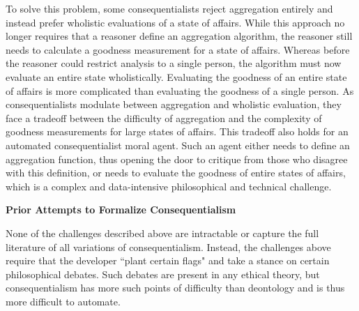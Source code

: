 \begin{isabellebody}
\begin{isamarkuptext}
To solve this problem, some consequentialists reject aggregation entirely and instead prefer wholistic
evaluations of a state of affairs. While this approach no longer requires that a reasoner define an 
aggregation algorithm, the reasoner still needs to calculate a goodness measurement for a state of 
affairs. Whereas before the reasoner could restrict analysis to a single person, the algorithm must now 
evaluate an entire state wholistically. Evaluating the goodness of an entire state of affairs is more complicated
than evaluating the goodness of a single person. As consequentialists modulate between aggregation 
and wholistic evaluation, they face a tradeoff between the difficulty of aggregation and the complexity 
of goodness measurements for large states of affairs. This tradeoff also holds for an automated
consequentialist moral agent. Such an agent either needs to define an aggregation function, thus opening 
the door to critique from those who disagree with this definition, or needs to evaluate the goodness of entire states
of affairs, which is a complex and data-intensive philosophical and technical challenge.%
\end{isamarkuptext}\isamarkuptrue%
%
\begin{isamarkuptext}%
\textbf{Prior Attempts to Formalize Consequentialism}%
\end{isamarkuptext}\isamarkuptrue%
%
\begin{isamarkuptext}%
None of the challenges described above are intractable or capture the full literature of 
all variations of consequentialism. Instead, the challenges above require that the developer 
``plant certain flags" and take a stance on certain philosophical debates. Such debates are present in 
any ethical theory, but consequentialism has more such points of difficulty than deontology and 
is thus more difficult to automate. 


\end{isamarkuptext}
\end{isabellebody}
